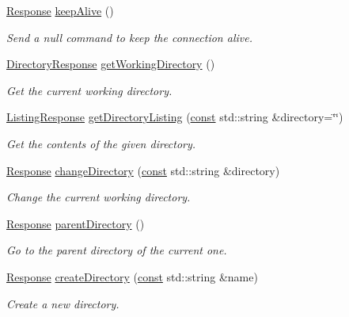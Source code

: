 \begin{DoxyCompactItemize}
\hyperlink{classsf_1_1_ftp_1_1_response}{Response} \hyperlink{classsf_1_1_ftp_aa1127d442b4acb2105aa8060a39d04fc}{keep\-Alive} ()
\begin{DoxyCompactList}\small\item\em Send a null command to keep the connection alive. \end{DoxyCompactList}\item 
\hyperlink{classsf_1_1_ftp_1_1_directory_response}{Directory\-Response} \hyperlink{classsf_1_1_ftp_a79c654fcdd0c81e68c4fa29af3b45e0c}{get\-Working\-Directory} ()
\begin{DoxyCompactList}\small\item\em Get the current working directory. \end{DoxyCompactList}\item 
\hyperlink{classsf_1_1_ftp_1_1_listing_response}{Listing\-Response} \hyperlink{classsf_1_1_ftp_a8f37258e461fcb9e2a0655e9df0be4a0}{get\-Directory\-Listing} (\hyperlink{term__entry_8h_a57bd63ce7f9a353488880e3de6692d5a}{const} std\-::string \&directory=\char`\"{}\char`\"{})
\begin{DoxyCompactList}\small\item\em Get the contents of the given directory. \end{DoxyCompactList}\item 
\hyperlink{classsf_1_1_ftp_1_1_response}{Response} \hyperlink{classsf_1_1_ftp_a7e93488ea6330dd4dd76e428da9bb6d3}{change\-Directory} (\hyperlink{term__entry_8h_a57bd63ce7f9a353488880e3de6692d5a}{const} std\-::string \&directory)
\begin{DoxyCompactList}\small\item\em Change the current working directory. \end{DoxyCompactList}\item 
\hyperlink{classsf_1_1_ftp_1_1_response}{Response} \hyperlink{classsf_1_1_ftp_ad295cf77f30f9ad07b5c401fd9849189}{parent\-Directory} ()
\begin{DoxyCompactList}\small\item\em Go to the parent directory of the current one. \end{DoxyCompactList}\item 
\hyperlink{classsf_1_1_ftp_1_1_response}{Response} \hyperlink{classsf_1_1_ftp_a247b84c4b25da37804218c2b748c4787}{create\-Directory} (\hyperlink{term__entry_8h_a57bd63ce7f9a353488880e3de6692d5a}{const} std\-::string \&name)
\begin{DoxyCompactList}\small\item\em Create a new directory. \end{DoxyCompactList}\item 

\end{DoxyCompactItemize}
